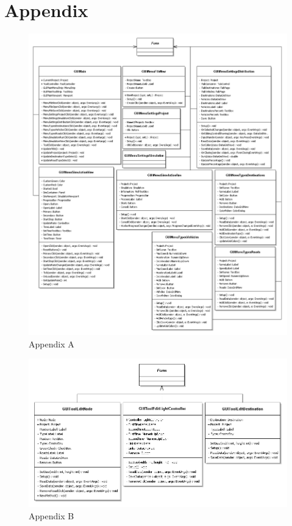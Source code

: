 \appendix
\chapter{Appendix}\label{[CHAPTER] Appendix}

\begin{figure}[H]
\centering
\includegraphics[width=\textwidth,height=\textheight,keepaspectratio]{Pictures/Klassediagram/GUI}
\caption{Appendix A}
\end{figure}\label{AppendixA}

\begin{figure}[H]
\centering
\includegraphics[width=\textwidth,height=\textheight,keepaspectratio]{Pictures/Klassediagram/GUIEdit}
\caption{Appendix B}
\end{figure}\label{AppendixB}


